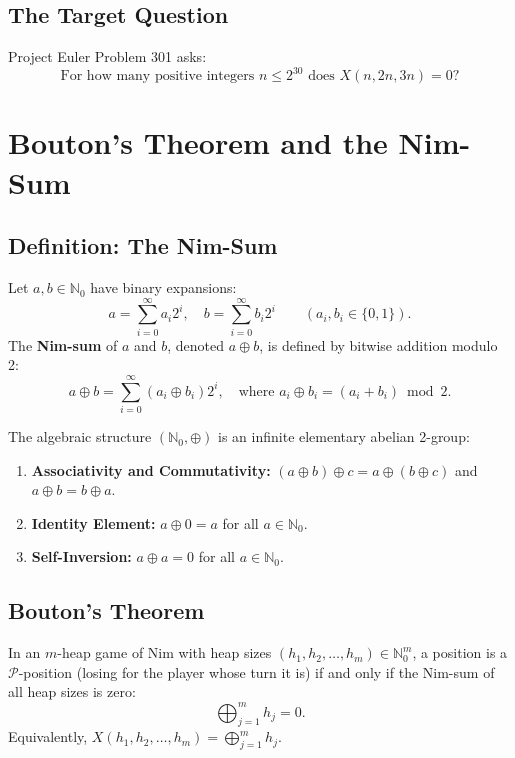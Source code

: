 ﻿\documentclass[a4paper]{article}
\begin{document}
\subsection{The Target Question}
Project Euler Problem 301 asks:
\begin{equation}
\text{For how many positive integers } n \le 2^{30} \text{ does } X(n, 2n, 3n) = 0?
\end{equation}


\section{Bouton's Theorem and the Nim-Sum}

\subsection{Definition: The Nim-Sum}
\begin{definition}
Let $a, b \in \mathbb{N}_0$ have binary expansions:
\begin{equation}
a = \sum_{i=0}^\infty a_i 2^i, \quad b = \sum_{i=0}^\infty b_i 2^i \qquad (a_i, b_i \in \{0, 1\}).
\end{equation}
The \textbf{Nim-sum} of $a$ and $b$, denoted $a \oplus b$, is defined by bitwise addition modulo 2:
\begin{equation}
a \oplus b = \sum_{i=0}^\infty (a_i \oplus b_i) 2^i, \quad \text{where } a_i \oplus b_i = (a_i + b_i) \bmod 2.
\end{equation}
\end{definition}

The algebraic structure $(\mathbb{N}_0, \oplus)$ is an infinite elementary abelian 2-group:
\begin{enumerate}[label=(\roman*)]
    \item \textbf{Associativity and Commutativity:} $(a \oplus b) \oplus c = a \oplus (b \oplus c)$ and $a \oplus b = b \oplus a$.
    \item \textbf{Identity Element:} $a \oplus 0 = a$ for all $a \in \mathbb{N}_0$.
    \item \textbf{Self-Inversion:} $a \oplus a = 0$ for all $a \in \mathbb{N}_0$.
\end{enumerate}

\subsection{Bouton's Theorem}
\begin{theorem}[Bouton, 1901]\label{thm:nim:bouton}
In an $m$-heap game of Nim with heap sizes $(h_1, h_2, \dots, h_m) \in \mathbb{N}_0^m$, a position is a $\mathcal{P}$-position (losing for the player whose turn it is) if and only if the Nim-sum of all heap sizes is zero:
\begin{equation}
\bigoplus_{j=1}^m h_j = 0.
\end{equation}
Equivalently, $X(h_1, h_2, \dots, h_m) = \bigoplus_{j=1}^m h_j$.
\end{theorem}
\end{document}
